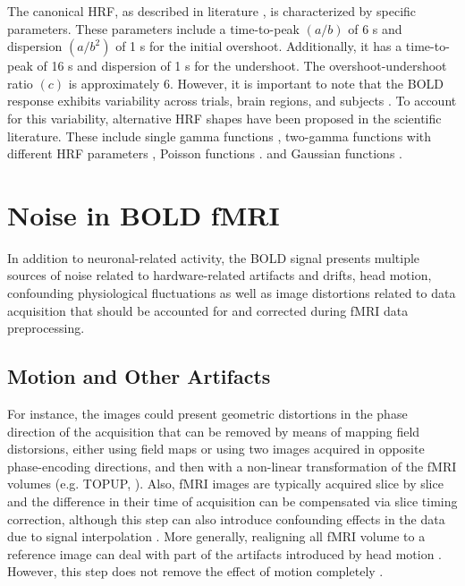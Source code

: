 The canonical HRF, as described in literature
\citep{Friston2007Statisticalparametricmapping}, is characterized by specific
parameters. These parameters include a time-to-peak $(a/b)$ of 6 s and
dispersion $(a/b^2)$ of 1 s for the initial overshoot. Additionally, it has a
time-to-peak of 16 s and dispersion of 1 s for the undershoot. The
overshoot-undershoot ratio $(c)$ is approximately 6. However, it is important to
note that the BOLD response exhibits variability across trials, brain regions,
and subjects
\citep{Aguirre1998VariabilityHumanBOLD,Duann2002SingleTrialVariability,Handwerker2004VariationBOLDhemodynamic,McGonigle2000VariabilityfMRIExamination,Smith2005VariabilityfMRIre}.
To account for this variability, alternative HRF shapes have been proposed in
the scientific literature. These include single gamma functions
\citep{Boynton1996LinearSystemsAnalysis,Cohen1997ParametricAnalysisfMRI},
two-gamma functions with different HRF parameters
\citep{Glover1999DeconvolutionImpulseResponse}, Poisson functions
\citep{Friston1994AnalysisfunctionalMRI}. and Gaussian functions
\citep{Kruggel1999Modelinghemodynamicresponse,Rajapakse1998Modelinghemodynamicresponse}.

\section{Noise in BOLD fMRI}

In addition to neuronal-related activity, the BOLD signal presents multiple
sources of noise related to hardware-related artifacts and drifts, head motion,
confounding physiological fluctuations
\citep{Bianciardi2009Sourcesfunctionalmagnetic,Jorge2013SignalfluctuationsfMRI}
as well as image distortions related to data acquisition that should be
accounted for and corrected during fMRI data preprocessing.

\subsection{Motion and Other Artifacts}

For instance, the images could present geometric distortions in the phase
direction of the acquisition that can be removed by means of mapping field
distorsions, either using field maps or using two images acquired in opposite
phase-encoding directions, and then with a non-linear transformation of the fMRI
volumes (e.g. TOPUP,
\cite{Andersson2003Howcorrectsusceptibility,Glasser2018UsingtemporalICA}). Also,
fMRI images are typically acquired slice by slice and the difference in their
time of acquisition can be compensated via slice timing correction, although
this step can also introduce confounding effects in the data due to signal
interpolation \citep{Parker2019BenefitSliceTiming}. More generally, realigning
all fMRI volume to a reference image can deal with part of the artifacts
introduced by head motion \citep{Friston1994Statisticalparametricmaps}. However,
this step does not remove the effect of motion completely
\citep{CaballeroGaudes2017MethodscleaningBOLD}.

